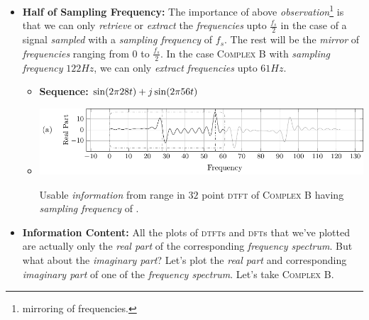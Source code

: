 \documentclass[../../course]{subfiles}
\begin{document}
\begin{itemize} [label=]
\begin{itemize} [label=]
        \end{itemize}

    \item \textbf{Half of Sampling Frequency:} The importance of above
        \emph{observation}\footnote{mirroring of frequencies.} is that we can
        only \emph{retrieve} or \emph{extract} the \emph{frequencies} upto
        $\frac{f_{s}}{2}$ in the case of a signal \emph{sampled} with a
        \emph{sampling frequency} of $f_{s}$. The rest will be the \emph{mirror}
        of \emph{frequencies} ranging from $0$ to $\frac{f_{s}}{2}$. In the
        case \textsc{Complex B} with \emph{sampling frequency} $122 \si{Hz}$,
        we can only \emph{extract} \emph{frequencies} upto $61 \si{Hz}$.

        \begin{itemize} [label=]

            \item \textbf{Sequence:} $\sin(2 \pi 28 t) + j \sin(2 \pi 56 t)$

            \item
                \begin{minipage}[b] {0.85\textwidth}
                    \vspace{6pt}
                    \centering
                     {
                        \includegraphics[height = 0.8\textheight] {tikzpics/plotHalfSampFreq.pdf}
                    }

                     {
                        Usable \emph{information} from \firstRange range in $32$ point \textsc{dtft} of
                        \textsc{Complex B} having \emph{sampling frequency} of \sampFreqSligGreatJust.
                    }
                    \label{plt:halfSampFreq}

                \end{minipage}

        \end{itemize}

    \item \textbf{Information Content:} All the plots of \textsc{dtft}s and \textsc{dft}s
        that we've plotted are actually only the \emph{real part} of the corresponding
        \emph{frequency spectrum}. But what about the \emph{imaginary part}? Let's plot
        the \emph{real part} and corresponding \emph{imaginary part} of one of the
        \emph{frequency spectrum}. Let's take \textsc{Complex B.}


\end{itemize}
\end{document}
